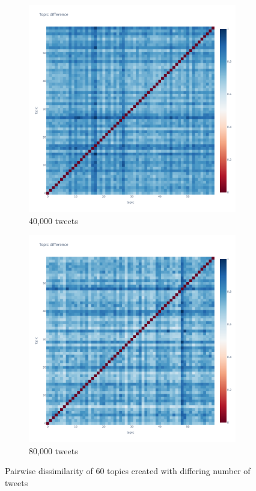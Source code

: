 \documentclass[sigconf, nonacm]{acmart}
\begin{document}
\begin{figure}[ht]
	\centering
	\begin{subfigure}[b]{0.45\textwidth}
		\centering
		\includegraphics[width=\textwidth, trim={1cm 1cm 1cm 2cm}, clip]{figures/40k/diff_matrix_plotly.png}
		\caption{40,000 tweets}
		\label{fig:diff_mtx_40k}
	\end{subfigure}
	\hfill
	\begin{subfigure}[b]{0.45\textwidth}
		\centering
		\includegraphics[width=\textwidth, trim={1cm 1cm 1cm 2cm}, clip]{figures/80k/diff_matrix_plotly.png}
		\caption{80,000 tweets}
		\label{fig:diff_mtx_80k}
	\end{subfigure}
	\caption{Pairwise dissimilarity of 60 topics created with differing number of tweets}
	\label{fig:topic-dissim}
\end{figure}
\end{document}
